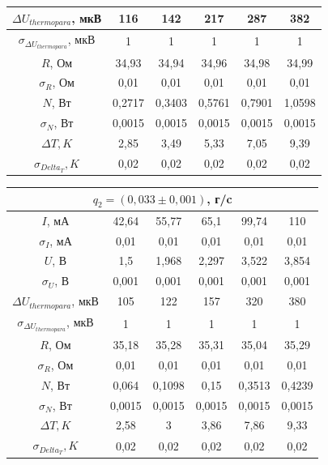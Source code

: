 \documentclass[a4paper, 12pt]{article}%
\begin{document}
\begin{enumerate}
\begin{center}
\begin{tabular}{|c|c|c|c|c|c|}
$\Delta U_{thermopara}$, мкВ & 116 & 142 & 217 & 287 & 382 \\ \hline
$\sigma_{\Delta U_{thermopara}}$, мкВ & 1 & 1 & 1 & 1 & 1 \\ \hline
$R$, Ом & 34,93 & 34,94 & 34,96 & 34,98 & 34,99 \\ \hline
$\sigma_R$, Ом & 0,01 & 0,01 & 0,01 & 0,01 & 0,01 \\ \hline
$N$, Вт & 0,2717 & 0,3403 & 0,5761 & 0,7901 & 1,0598 \\ \hline
$\sigma_N$, Вт & 0,0015 & 0,0015 & 0,0015 & 0,0015 & 0,0015 \\ \hline
$\Delta T, K$ & 2,85 & 3,49 & 5,33 & 7,05 & 9,39 \\ \hline
$\sigma_{Delta_T}, K$ & 0,02 & 0,02 & 0,02 & 0,02 & 0,02 \\ \hline
\end{tabular}

\begin{tabular}{|c|c|c|c|c|c|}
\hline
\multicolumn{6}{|c|}{$q_2 = (0,033 \pm0,001)$, г/c} \\ \hline
$I$, мА & 42,64 & 55,77 & 65,1 & 99,74 & 110 \\ \hline
$\sigma_I$, мА & 0,01 & 0,01 & 0,01 & 0,01 & 0,01 \\ \hline
$U$, В & 1,5 & 1,968 & 2,297 & 3,522 & 3,854 \\ \hline
$\sigma_U$, В & 0,001 & 0,001 & 0,001 & 0,001 & 0,001 \\ \hline
$\Delta U_{thermopara}$, мкВ & 105 & 122 & 157 & 320 & 380 \\ \hline
$\sigma_{\Delta U_{thermopara}}$, мкВ & 1 & 1 & 1 & 1 & 1 \\ \hline
$R$, Ом & 35,18 & 35,28 & 35,31 & 35,04 & 35,29 \\ \hline
$\sigma_R$, Ом & 0,01 & 0,01 & 0,01 & 0,01 & 0,01 \\ \hline
$N$, Вт & 0,064 & 0,1098 & 0,15 & 0,3513 & 0,4239 \\ \hline
$\sigma_N$, Вт & 0,0015 & 0,0015 & 0,0015 & 0,0015 & 0,0015 \\ \hline
$\Delta T, K$ & 2,58 & 3 & 3,86 & 7,86 & 9,33 \\ \hline
$\sigma_{Delta_T}, K$ & 0,02 & 0,02 & 0,02 & 0,02 & 0,02 \\ \hline
\end{tabular}


\end{center}
\end{enumerate}
\end{document}
